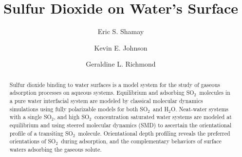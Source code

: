 \documentclass{article}
\title{Sulfur Dioxide on Water's Surface}
\author{Eric S. Shamay \and Kevin E. Johnson \and Geraldine L. Richmond}
\begin{document}
\newcommand{\suldiox}{SO$_2$}
\newcommand{\ang}{\,$\textrm{\AA}$}
\newcommand{\angs}{\ang}
\newcommand{\wat}{H$_2$O}


\linenumbers 
\doublespacing


\begin{abstract}
Sulfur dioxide binding to water surfaces is a model system for the study of gaseous adsorption processes on aqueous systems. Equilibrium and adsorbing \suldiox~molecules in a pure water interfacial system are modeled by classical molecular dynamics simulations using fully polarizable models for both \suldiox~and \wat. Neat-water systems with a single \suldiox, and high \suldiox~concentration saturated water systems are modeled at equilibrium and using steered molecular dynamics (SMD) to ascertain the orientational profile of a transiting \suldiox~molecule. Orientational depth profiling reveals the preferred orientations of \suldiox~during adsorption, and the complementary behaviors of surface waters adsorbing the gaseous solute.
\end{abstract}







\end{document}
